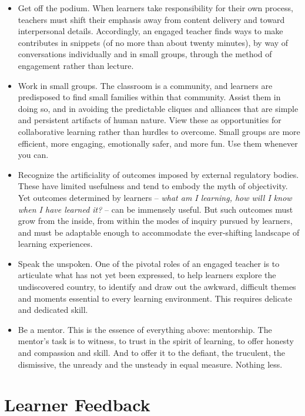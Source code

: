 \documentclass[10pt,DIV09,letterpaper,oneside,headsepline]{scrreprt}
\begin{document}
\begin{itemize}
\item Get off the podium. When learners take responsibility for their own process, teachers must shift their emphasis away from content delivery and toward interpersonal details. Accordingly, an engaged teacher finds ways to make contributes in snippets (of no more than about twenty minutes), by way of conversations individually and in small groups, through the method of engagement rather than lecture.

\item Work in small groups. The classroom is a community, and learners are predisposed to find small families within that community. Assist them in doing so, and in avoiding the predictable cliques and alliances that are simple and persistent artifacts of human nature. View these as opportunities for collaborative learning rather than hurdles to overcome. Small groups are more efficient, more engaging, emotionally safer, and more fun. Use them whenever you can.

\item Recognize the artificiality of outcomes imposed by external regulatory bodies. These have limited usefulness and tend to embody the myth of objectivity. Yet outcomes determined by learners -- \textit{what am I learning, how will I know when I have learned it?} -- can be immensely useful. But such outcomes must grow from the inside, from within the modes of inquiry pursued by learners, and must be adaptable enough to accommodate the ever-shifting landscape of learning experiences.

\item Speak the unspoken. One of the pivotal roles of an engaged teacher is to articulate what has not yet been expressed, to help learners explore the undiscovered country, to identify and draw out the awkward, difficult themes and moments essential to every learning environment. This requires delicate and dedicated skill.

\item Be a mentor. This is the essence of everything above: mentorship. The mentor’s task is to witness, to trust in the spirit of learning, to offer honesty and compassion and skill. And to offer it to the defiant, the truculent, the dismissive, the unready and the unsteady in equal measure. Nothing less.

\end{itemize}

\chapter{Learner Feedback}
\end{document}
